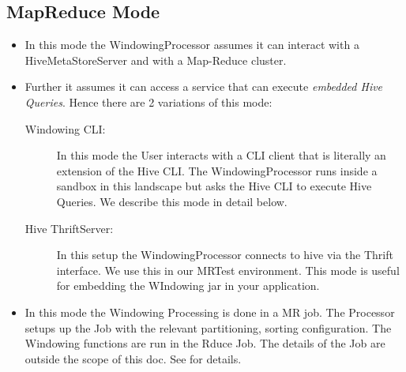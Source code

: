 \documentclass[pdftex,10pt,a4paper]{article}
\begin{document}
\subsection{MapReduce Mode}
\begin{itemize}
\item In this mode the WindowingProcessor assumes it can interact with
  a HiveMetaStoreServer and with a Map-Reduce cluster.
\item Further it assumes it can access a service that can execute {\em
    embedded Hive Queries}. Hence there are 2 variations of this mode:
  \begin{description}
    \item[Windowing CLI:] In this mode the User interacts with a CLI
      client that is literally an extension of the Hive CLI. The
      WindowingProcessor runs inside a sandbox in this landscape but
      asks the Hive CLI to execute Hive Queries. We describe this mode
      in detail below.
    \item[Hive ThriftServer:] In this setup the WindowingProcessor
      connects to hive via the Thrift interface. We use this in our
      MRTest environment. This mode is useful for embedding the
      WIndowing jar in your application.
  \end{description}
\item In this mode the Windowing Processing is done in a MR job. The
  Processor setups up the Job with the relevant partitioning, sorting
  configuration. The Windowing functions are run in the Rduce Job. The
  details of the Job are outside the scope of this doc. See
  \cite{wndwi} for details.
\end{itemize}
\end{document}
